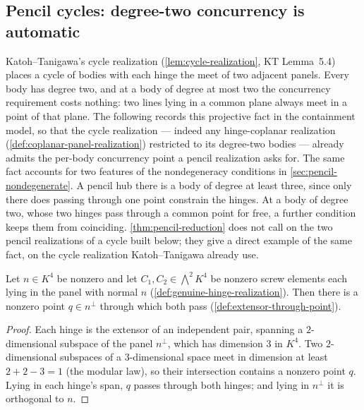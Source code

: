 \subsection{Pencil cycles: degree-two concurrency is automatic}
\label{sec:pencil-cycle}

Katoh--Tanigawa's cycle realization (\cref{lem:cycle-realization},
KT Lemma~5.4) places a cycle of bodies with each hinge the meet of two
adjacent panels. Every body has degree two, and at a body of degree at
most two the concurrency requirement costs nothing: two lines lying in a
common plane always meet in a point of that plane. The following records
this projective fact in the containment model, so that the cycle
realization --- indeed any hinge-coplanar realization
(\cref{def:coplanar-panel-realization}) restricted to its degree-two
bodies --- already admits the per-body concurrency point a pencil
realization asks for. The same fact accounts for two features of the
nondegeneracy conditions in \cref{sec:pencil-nondegenerate}. A pencil
hub there is a body of
degree at least three, since only there does passing through one point
constrain the hinges. At a body of degree two, whose two hinges pass
through a common point for free, a further condition keeps them from
coinciding. \cref{thm:pencil-reduction} does not call on the two pencil
realizations of a cycle built below; they give a direct example of the
same fact, on the cycle realization Katoh--Tanigawa already use.

\begin{lemma}
  \label{lem:coplanar-hinges-concurrent}
  \leanok
  Let $n \in K^4$ be nonzero and let $C_1, C_2 \in \bigwedge^{2} K^{4}$
  be nonzero screw elements each lying in the panel with normal $n$
  (\cref{def:genuine-hinge-realization}). Then there is a nonzero point
  $q \in n^{\perp}$ through which both pass
  (\cref{def:extensor-through-point}).
\end{lemma}
\begin{proof}
  \leanok
  Each hinge is the extensor of an independent pair, spanning a
  $2$-dimensional subspace of the panel $n^{\perp}$, which has dimension
  $3$ in $K^4$. Two $2$-dimensional subspaces of a $3$-dimensional space
  meet in dimension at least $2 + 2 - 3 = 1$ (the modular law), so their
  intersection contains a nonzero point $q$. Lying in each hinge's span,
  $q$ passes through both hinges; and lying in $n^{\perp}$ it is
  orthogonal to $n$.
\end{proof}

